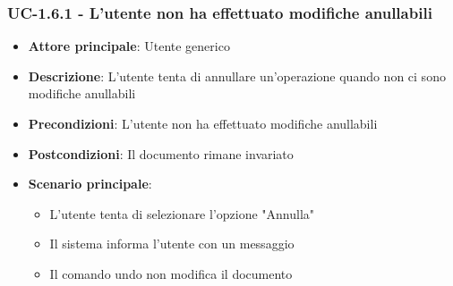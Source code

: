 \documentclass[11pt,a4paper]{article}
\begin{document}
\subsubsection{UC-1.6.1 - L'utente non ha effettuato modifiche anullabili}
\begin{itemize}
    \item \textbf{Attore principale}: Utente generico
    \item \textbf{Descrizione}: L'utente tenta di annullare un'operazione quando non ci sono modifiche anullabili
    \item \textbf{Precondizioni}: L'utente non ha effettuato modifiche anullabili
    \item \textbf{Postcondizioni}: Il documento rimane invariato
    \item \textbf{Scenario principale}:
        \begin{itemize}
            \item L'utente tenta di selezionare l'opzione "Annulla"
            \item Il sistema informa l'utente con un messaggio
            \item Il comando undo non modifica il documento
        \end{itemize}
\end{itemize}
\end{document}
